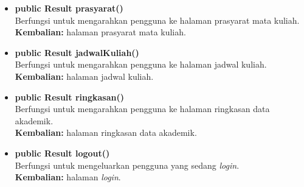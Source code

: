 \begin{enumerate}
\begin{itemize}
			\item \textbf{public Result prasyarat()}\\
				Berfungsi untuk mengarahkan pengguna ke halaman prasyarat mata kuliah.\\
				\textbf{Kembalian:} halaman prasyarat mata kuliah.
				
			\item \textbf{public Result jadwalKuliah()}\\
				Berfungsi untuk mengarahkan pengguna ke halaman jadwal kuliah.\\
				\textbf{Kembalian:} halaman jadwal kuliah.
				
			\item \textbf{public Result ringkasan()}\\
				Berfungsi untuk mengarahkan pengguna ke halaman ringkasan data akademik.\\
				\textbf{Kembalian:} halaman ringkasan data akademik.
				
			\item \textbf{public Result logout()}\\
				Berfungsi untuk mengeluarkan pengguna yang sedang \textit{login}.\\
				\textbf{Kembalian:} halaman \textit{login}.
		\end{itemize}
		

\end{enumerate}
